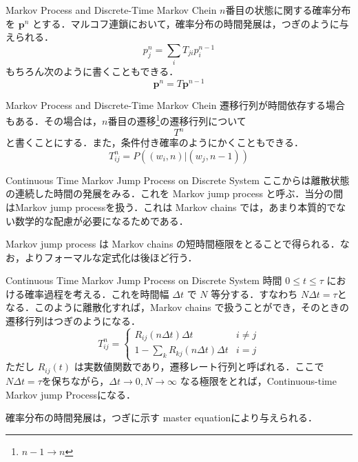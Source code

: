 \documentclass[aspectratio=169, dvipdfmx, 11pt,uplatex]{beamer} %
\begin{document}
\begin{frame}{Markov Process and Discrete-Time Markov Chein}
  $n$番目の状態に関する確率分布を $\mathbf{p}^n$ とする．マルコフ連鎖において，確率分布の時間発展は，つぎのように与えられる．
  \begin{equation}
    p^n_j = \sum_i T_{ji} p^{n-1}_i
  \end{equation}
  もちろん次のように書くこともできる．
  \begin{equation}
    \mathbf{p}^n = T \mathbf{p}^{n-1}
  \end{equation}
\end{frame}

\begin{frame}{Markov Process and Discrete-Time Markov Chein}
  遷移行列が時間依存する場合もある．その場合は，$n$番目の遷移\footnote{$n-1 \to n$}の遷移行列について
  \begin{equation}
    T^n
  \end{equation}
  と書くことにする．また，条件付き確率のようにかくこともできる．
  \begin{equation}
    T_{ij}^n = P((w_i, n)|(w_j, n-1))
  \end{equation}
\end{frame}

\begin{frame}{Continuous Time Markov Jump Process on Discrete System}
  ここからは離散状態の連続した時間の発展をみる．これを Markov jump process と呼ぶ．当分の間はMarkov jump processを扱う．これは Markov chains では，あまり本質的でない数学的な配慮が必要になるためである．\par 
  Markov jump process は Markov chains の短時間極限をとることで得られる．なお，よりフォーマルな定式化は後ほど行う．
\end{frame}

\begin{frame}{Continuous Time Markov Jump Process on Discrete System}
  時間 $0 \leqslant t \leqslant \tau $ における確率過程を考える．これを時間幅 $\Delta t$ で $N$ 等分する．すなわち $N \Delta t = \tau $となる．このように離散化すれば，Markov chains で扱うことができ，そのときの遷移行列はつぎのようになる．
  \begin{equation}
    T_{ij}^n = 
    \begin{cases}
      R_{ij}(n \Delta t) \Delta t & i \neq j \\
      1 - \sum_k R_{kj} (n \Delta t) \Delta t & i = j
    \end{cases}
  \end{equation}
  ただし $R_{ij}(t)$ は実数値関数であり，遷移レート行列と呼ばれる．ここで $N \Delta t = \tau $を保ちながら，$\Delta t \to 0, N \to \infty $ なる極限をとれば，Continuous-time Markov jump Processになる．\par 
  確率分布の時間発展は，つぎに示す master equationにより与えられる．
\end{frame}
\end{document}

